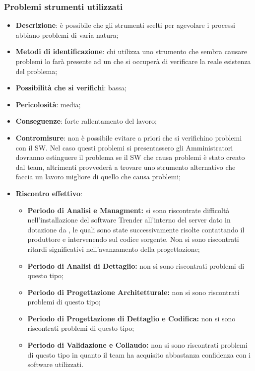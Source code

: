 		\subsubsection{Problemi  strumenti utilizzati}
		\begin{itemize}
			\item \textbf{Descrizione}: è possibile che gli strumenti scelti per agevolare i processi abbiano problemi di varia natura;
			\item \textbf{Metodi di identificazione}: chi utilizza uno strumento che sembra causare problemi lo farà presente ad un \AM{} che si occuperà di verificare la reale esistenza del problema;
			\item \textbf{Possibilità che si verifichi}: bassa;
			\item \textbf{Pericolosità}: media;
			\item \textbf{Conseguenze}: forte rallentamento del lavoro;
			\item \textbf{Contromisure}: non è possibile evitare a priori che si verifichino problemi con il SW. Nel caso questi problemi si presentassero gli Amministratori dovranno estinguere il problema se il SW che causa problemi è stato creato dal team, altrimenti provvederà a trovare uno strumento alternativo che faccia un lavoro migliore di quello che causa problemi;
			\item \textbf{Riscontro effettivo}:
			\begin{itemize}
				\item \textbf{Periodo di Analisi e Managment:} si sono riscontrate difficoltà nell'installazione del software Trender all'interno del server dato in dotazione da \PROPONENTE, le quali sono state successivamente risolte contattando il produttore e intervenendo sul codice sorgente. Non si sono riscontrati ritardi significativi nell'avanzamento della progettazione;
				\item \textbf{Periodo di Analisi di Dettaglio:} non si sono riscontrati problemi di questo tipo;
				\item \textbf{Periodo di Progettazione Architetturale:} non si sono riscontrati problemi di questo tipo;
            \item \textbf{Periodo di Progettazione di Dettaglio e Codifica:} non si sono riscontrati problemi di questo tipo;
            \item \textbf{Periodo di Validazione e Collaudo:} non si sono riscontrati problemi di questo tipo in quanto il team ha acquisito abbastanza confidenza con i software utilizzati.
			\end{itemize}
		\end{itemize}


